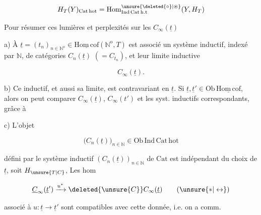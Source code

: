 
\[
H_T(Y)_{\mathrm{Cat\,hot}}=\mathrm{Hom}^{\unsure{\deleted{\circ}|\circledast}}_{\mathrm{Ind\,Cat\,h.t}}(Y,H_T)
\]

Pour résumer ces lumières et perplexités sur les $C_\infty(\underline t)$

a) À  $\underline t=(t_n)_{n\in\mathbb N^{\mathrm o}}\in\underline{\mathrm{Hom\,cof}}(\mathbb N^{\mathrm o},T)$ est associé un système inductif, indexé par $\mathbb N$, de catégories $C_n(\underline t)$ $(=C_{t_n})$, et leur limite inductive

\[
C_\infty(\underline t).
\]

b) Ce inductif, et aussi sa limite, est  contravariant en $\underline t$. Si $\underline t,\underline t'\in\mathrm{Ob}\,\underline{\mathrm{Hom\,cof}}$, alors on peut comparer $C_\infty(\underline t)$, $C_\infty(t')$ et les syst. inductifs correspondants, grâce à


c) L'objet

\[
\big(C_n(\underline t)\big)_{n\in\mathbb N}\in\mathrm{Ob}\,\mathrm{Ind\,Cat\,hot}
\]

défini par le système inductif $(C_n(\underline t))_{n\in\mathbb N}$ de $\mathrm{Cat}$ est  indépendant du choix de $\underline t$, soit $H_{\unsure{T|C}}$, Les hom

\[
\underline C_\infty(\underline t')\xrightarrow{u^*}\deleted{\unsure{C}}C_\infty(\underline t)
\tag*{$(\unsure{*|\leftrightarrow})$}
\]

associé à $u:\underline t\longrightarrow\underline t'$ sont compatibles avec cette donnée, i.e. on a comm. 


